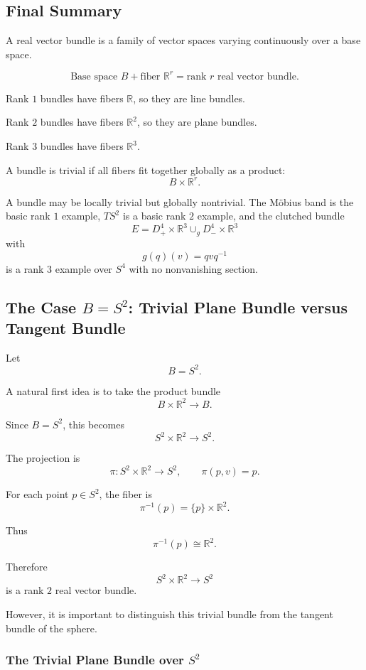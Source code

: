 \documentclass[12pt,a4paper]{article}
\theoremstyle{notespace}
\begin{document}
\subsection{Final Summary}

A real vector bundle is a family of vector spaces varying continuously over a base space.

\[
\boxed{
	\text{Base space }B
	+
	\text{fiber }\mathbb R^r
	=
	\text{rank }r\text{ real vector bundle.}
}
\]

Rank \(1\) bundles have fibers \(\mathbb R\), so they are line bundles.

Rank \(2\) bundles have fibers \(\mathbb R^2\), so they are plane bundles.

Rank \(3\) bundles have fibers \(\mathbb R^3\).

A bundle is trivial if all fibers fit together globally as a product:
\[
B\times \mathbb R^r.
\]

A bundle may be locally trivial but globally nontrivial. The Möbius band is the basic rank \(1\) example, \(TS^2\) is a basic rank \(2\) example, and the clutched bundle
\[
E=
D^4_+\times \mathbb R^3
\cup_g
D^4_-\times \mathbb R^3
\]
with
\[
g(q)(v)=qvq^{-1}
\]
is a rank \(3\) example over \(S^4\) with no nonvanishing section.

\subsection{The Case \(B=S^2\): Trivial Plane Bundle versus Tangent Bundle}

Let
\[
B=S^2.
\]

A natural first idea is to take the product bundle
\[
B\times \mathbb R^2\longrightarrow B.
\]

Since \(B=S^2\), this becomes
\[
S^2\times \mathbb R^2\longrightarrow S^2.
\]

The projection is
\[
\pi:S^2\times \mathbb R^2\longrightarrow S^2,
\qquad
\pi(p,v)=p.
\]

For each point \(p\in S^2\), the fiber is
\[
\pi^{-1}(p)=\{p\}\times \mathbb R^2.
\]

Thus
\[
\pi^{-1}(p)\cong \mathbb R^2.
\]

Therefore
\[
S^2\times \mathbb R^2\to S^2
\]
is a rank \(2\) real vector bundle.

However, it is important to distinguish this trivial bundle from the tangent bundle of the sphere.

\subsubsection{The Trivial Plane Bundle over \(S^2\)}
\end{document}
